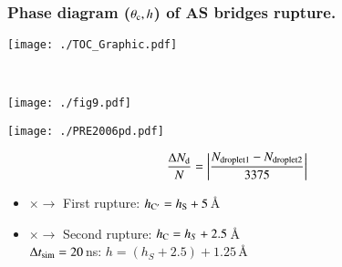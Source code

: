 \documentclass[8pt]{beamer}
\begin{document}
\begin{frame}
\frametitle{Phase diagram ($\theta_{\rm c},h$) of AS bridges rupture.}
      \begin{minipage}{0.5\textwidth}
          	\texttt{[image: ./TOC\_Graphic.pdf]}      	
      \end{minipage}	
      ~~			
      \begin{minipage}{0.45\textwidth}
      	  	\texttt{[image: ./fig9.pdf]}
      \end{minipage}

      \begin{minipage}{0.43\textwidth}
           	\texttt{[image: ./PRE2006pd.pdf]}
      \end{minipage}	
      \begin{minipage}{0.52\textwidth}
            $$\frac{\Delta N_{\rm d}}{N} = \left| \frac{N_{\rm droplet 1} - N_{\rm droplet 2}}{3375} \right|  $$ 
			\begin{itemize}
				\item {\color{red}$\times$}$\rightarrow$ First rupture: $h_{\rm C{}'} = h_{\rm S} + 5$\,\AA
				\vspace{0.2cm}
				\item {\color{black}$\times$}$\rightarrow$ Second rupture: $h_{\rm C}= h_S + 2.5$\,\AA \\
				 $\Delta t_{\rm sim}=20$\,ns: $h = (h_{S} +2.5) + 1.25$\,\AA      
			\end{itemize}
      \end{minipage}
      

\end{frame}
\end{document}
